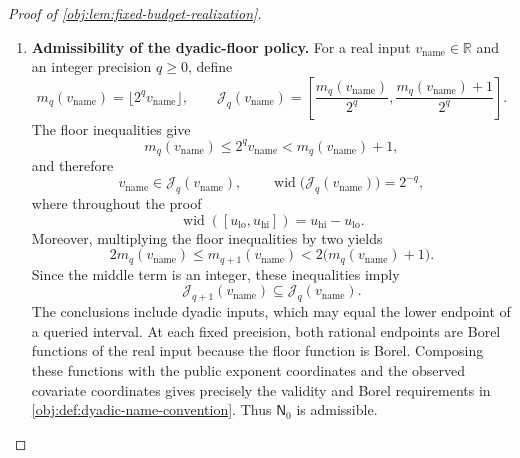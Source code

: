 \documentclass[11pt]{article}
\begin{document}
\begin{proof}[Proof of \cref{obj:lem:fixed-budget-realization}]
\begin{enumerate}
\item \textbf{Admissibility of the dyadic-floor policy.}
For a real input \(v_{\mathrm{name}}\in\mathbb R\) and an integer precision \(q\ge0\), define
\[
m_q(v_{\mathrm{name}})
=\lfloor 2^qv_{\mathrm{name}}\rfloor,
\qquad
\mathcal J_q(v_{\mathrm{name}})
=
\left[
\frac{m_q(v_{\mathrm{name}})}{2^q},
\frac{m_q(v_{\mathrm{name}})+1}{2^q}
\right].
\]
The floor inequalities give
\[
m_q(v_{\mathrm{name}})
\le 2^qv_{\mathrm{name}}
<m_q(v_{\mathrm{name}})+1,
\]
and therefore
\[
v_{\mathrm{name}}\in\mathcal J_q(v_{\mathrm{name}}),
\qquad
\operatorname{wid}\bigl(\mathcal J_q(v_{\mathrm{name}})\bigr)=2^{-q},
\]
where throughout the proof
\[
\operatorname{wid}([u_{\mathrm{lo}},u_{\mathrm{hi}}])
=u_{\mathrm{hi}}-u_{\mathrm{lo}}.
\]
Moreover, multiplying the floor inequalities by two yields
\[
2m_q(v_{\mathrm{name}})
\le m_{q+1}(v_{\mathrm{name}})
<2\bigl(m_q(v_{\mathrm{name}})+1\bigr).
\]
Since the middle term is an integer, these inequalities imply
\[
\mathcal J_{q+1}(v_{\mathrm{name}})
\subseteq\mathcal J_q(v_{\mathrm{name}}).
\]
The conclusions include dyadic inputs, which may equal the lower endpoint of a queried interval. At each fixed precision, both rational endpoints are Borel functions of the real input because the floor function is Borel. Composing these functions with the public exponent coordinates and the observed covariate coordinates gives precisely the validity and Borel requirements in \cref{obj:def:dyadic-name-convention}. Thus \(\mathsf N_0\) is admissible.


\end{enumerate}
\end{proof}
\end{document}

